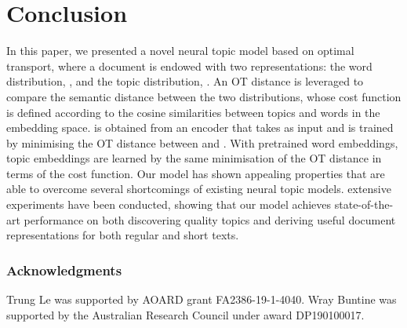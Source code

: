 \documentclass{article}
\begin{document}
\section{Conclusion}
In this paper, we presented a novel neural topic model based on optimal transport, where a document is endowed with two representations: the word distribution, , and the topic distribution, . An OT distance is leveraged to compare the semantic distance between the two distributions, whose cost function is defined according to the cosine similarities between topics and words in the embedding space.
 is obtained from an encoder that takes  as input and is trained by minimising the OT distance between  and .
With pretrained word embeddings, topic embeddings are learned by the same minimisation of the OT distance in terms of the cost function. Our model has shown appealing properties that are able to overcome several shortcomings of existing neural topic models.
extensive experiments have been conducted, showing that our model achieves state-of-the-art performance on both discovering quality topics and deriving useful document representations  for both regular and short texts. 

\subsubsection*{Acknowledgments}
Trung Le was supported by AOARD grant FA2386-19-1-4040.
Wray Buntine was supported by the Australian Research Council under award DP190100017.




\newpage
\appendix
{}
\end{document}
